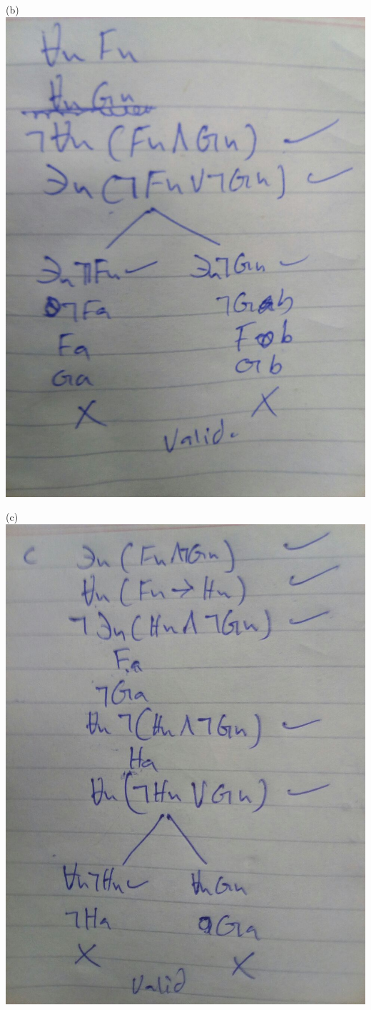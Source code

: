 \documentclass{article}
\begin{document}
(b) \includegraphics[width=\linewidth]{IMG_1023.JPG}

(c) \includegraphics[width=\linewidth]{IMG_1022.JPG}
\end{document}
